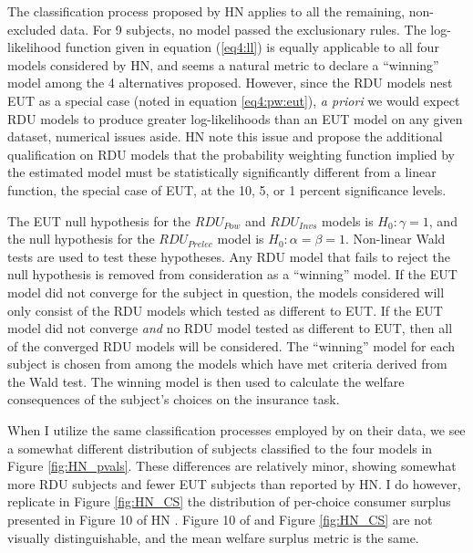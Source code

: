 \documentclass[../main.tex]{subfiles}
\begin{document}
The classification process proposed by HN applies to all the remaining, non-excluded data.
For 9 subjects, no model passed the exclusionary rules.
The log-likelihood function given in equation (\ref{eq4:ll}) is equally applicable to all four models considered by HN, and seems a natural metric to declare a \enquote{winning} model among the 4 alternatives proposed.
However, since the RDU models nest EUT as a special case (noted in equation \ref{eq4:pw:eut}), \textit{a priori} we would expect RDU models to produce greater log-likelihoods than an EUT model on any given dataset, numerical issues aside.
HN \parencite*[102]{Harrison2016} note this issue and propose the additional qualification on RDU models that the probability weighting function implied by the estimated model must be statistically significantly different from a linear function, the special case of EUT, at the 10, 5, or 1 percent significance levels.

The EUT null hypothesis for the $\mathit{RDU_{Pow}}$ and $\mathit{RDU_{Invs}}$ models is $H_0: \gamma = 1$, and the null hypothesis for the $\mathit{RDU_{Prelec}}$ model is $H_0: \alpha = \beta = 1$.
Non-linear Wald tests are used to test these hypotheses.
Any RDU model that fails to reject the null hypothesis is removed from consideration as a \enquote{winning} model.
If the EUT model did not converge for the subject in question, the models considered will only consist of the RDU models which tested as different to EUT.
If the EUT model did not converge \textit{and} no RDU model tested as different to EUT, then all of the converged RDU models will be considered.
The \enquote{winning} model for each subject is chosen from among the models which have met criteria derived from the Wald test.
The winning model is then used to calculate the welfare consequences of the subject's choices on the insurance task.

When I utilize the same classification processes employed by \textcite{Harrison2016} on their data, we see a somewhat different distribution of subjects classified to the four models in Figure \ref{fig:HN_pvals}.
These differences are relatively minor, showing somewhat more RDU subjects and fewer EUT subjects than reported by HN.
I do however, replicate in Figure \ref{fig:HN_CS} the distribution of per-choice consumer surplus presented in Figure 10 of HN \parencite[108]{Harrison2016}.
Figure 10 of \textcite{Harrison2016} and Figure \ref{fig:HN_CS} are not visually distinguishable, and the mean welfare surplus metric is the same.
\end{document}
